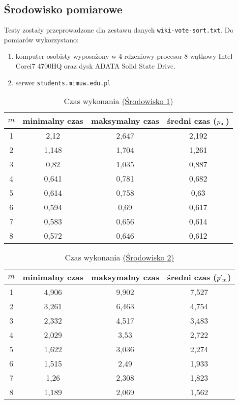 \documentclass{article}
\begin{document}
    \subsection{Środowisko pomiarowe}
    Testy zostały przeprowadzone dla zestawu danych \texttt{wiki-vote-sort.txt}.
    Do pomiarów wykorzystano:
    \begin{enumerate}[label={(\arabic*)}]
      \item
        \label{test:first}
        komputer osobisty wyposażony w 4-rdzeniowy procesor 8-wątkowy Intel\textsuperscript{
        \textregistered} Core\texttrademark i7 4700HQ oraz dysk ADATA\textsuperscript{
        \textregistered} Solid State Drive.
      \item
        \label{test:second}
        serwer \texttt{students.mimuw.edu.pl}
    \end{enumerate}

    \begin{table}[h]
      \centering
      \label{tab:times:first}
      \begin{tabular}{|c|c|c|c|}
        \hline
        \bfseries $m$ & \bfseries minimalny czas & \bfseries maksymalny czas &
        \bfseries średni czas ($p\textsubscript{m}$)\\
        \hline
        1 & 2,12  & 2,647 & 2,192 \\
        2 & 1,148 & 1,704 & 1,261 \\
        3 & 0,82  & 1,035 & 0,887 \\
        4 & 0,641 & 0,781 & 0,682 \\
        5 & 0,614 & 0,758 & 0,63  \\
        6 & 0,594 & 0,69  & 0,617 \\
        7 & 0,583 & 0,656 & 0,614 \\
        8 & 0,572 & 0,646 & 0,612 \\
        \hline
      \end{tabular}
      \caption{Czas wykonania \hyperref[test:first]{(Środowisko 1)}}
    \end{table}

    \begin{table}[h]
      \centering
      \label{tab:times:second}
      \begin{tabular}{|c|c|c|c|}
        \hline
        \bfseries $m$ & \bfseries minimalny czas & \bfseries maksymalny czas &
        \bfseries średni czas ($p'\textsubscript{m}$)\\
        \hline
        1 & 4,906 & 9,902 & 7,527 \\
        2 & 3,261 & 6,463 & 4,754 \\
        3 & 2,332 & 4,517 & 3,483 \\
        4 & 2,029 & 3,53  & 2,722 \\
        5 & 1,622 & 3,036 & 2,274 \\
        6 & 1,515 & 2,49  & 1,933 \\
        7 & 1,26  & 2,308 & 1,823 \\
        8 & 1,189 & 2,069 & 1,562 \\
        \hline
      \end{tabular}
      \caption{Czas wykonania \hyperref[test:second]{(Środowisko 2)}}
    \end{table}
\end{document}
